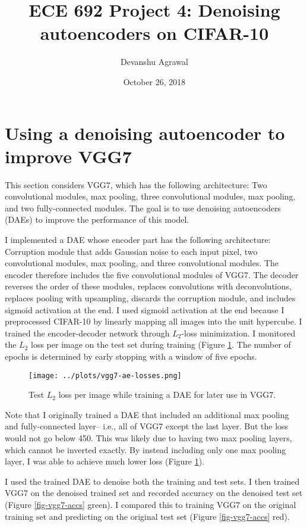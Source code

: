\documentclass[11pt]{article}
\title{ECE 692 Project 4: Denoising autoencoders on CIFAR-10}
\author{Devanshu Agrawal}
\date{October 26, 2018}
\begin{document}
\maketitle

\section{Using a denoising autoencoder to improve VGG7}

This section considers VGG7, which has the following architecture: Two convolutional modules, max pooling, three convolutional modules, max pooling, and two fully-connected modules. The goal is to use denoising autoencoders (DAEs) to improve the performance of this model.

I implemented a DAE whose encoder part has the following architecture: Corruption module that adds Gaussian noise to each input pixel, two convolutional modules, max pooling, and three convolutional modules. The encoder therefore includes the five convolutional modules of VGG7. The decoder reverses the order of these modules, replaces convolutions with deconvolutions, replaces pooling with upsampling, discards the corruption module, and includes sigmoid activation at the end. I used sigmoid activation at the end because I preprocessed CIFAR-10  by linearly mapping all images into the unit hypercube. I trained the encoder-decoder network through $L_2$-loss minimization. I monitored the $L_2$ loss per image on the test set during training (Figure \ref{fig-vgg7-ae}. The number of epochs is determined by early stopping with a window of five epochs.

\begin{figure}
\centering
\texttt{[image: ../plots/vgg7-ae-losses.png]}
\caption{\label{fig-vgg7-ae} Test $L_2$ loss per image while training a DAE for later use in VGG7.}
\end{figure}

Note that I originally trained a DAE that included an additional max pooling and fully-connected layer-- i.e., all of VGG7 except the last layer. But the loss would not go below 450. This was likely due to having two max pooling layers, which cannot be inverted exactly. By instead including only one max pooling layer, I was able to achieve much lower loss (Figure \ref{fig-vgg7-ae}).

I used the trained DAE to denoise both the training and test sets. I then trained VGG7 on the denoised trained set and recorded accuracy on the denoised test set (Figure \ref{fig-vgg7-accs} green). I compared this to training VGG7 on the original training set and predicting on the original test set (Figure \ref{fig-vgg7-accs} red).
\end{document}
